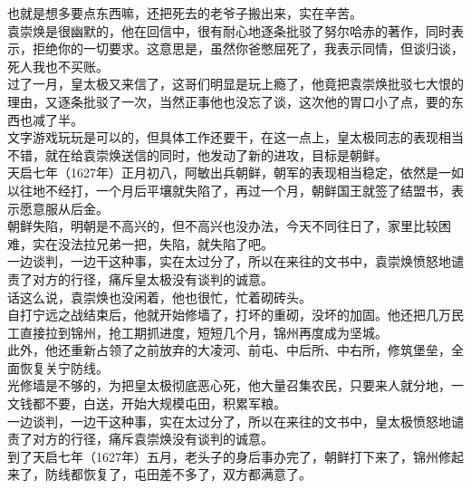 \begin{multicols}{\theparacolNo}
也就是想多要点东西嘛，还把死去的老爷子搬出来，实在辛苦。\\

袁崇焕是很幽默的，他在回信中，很有耐心地逐条批驳了努尔哈赤的著作，同时表示，拒绝你的一切要求。这意思是，虽然你爸憋屈死了，我表示同情，但谈归谈，死人我也不买账。\\

过了一月，皇太极又来信了，这哥们明显是玩上瘾了，他竟把袁崇焕批驳七大恨的理由，又逐条批驳了一次，当然正事他也没忘了谈，这次他的胃口小了点，要的东西也减了半。\\

文字游戏玩玩是可以的，但具体工作还要干，在这一点上，皇太极同志的表现相当不错，就在给袁崇焕送信的同时，他发动了新的进攻，目标是朝鲜。\\

天启七年（1627年）正月初八，阿敏出兵朝鲜，朝军的表现相当稳定，依然是一如以往地不经打，一个月后平壤就失陷了，再过一个月，朝鲜国王就签了结盟书，表示愿意服从后金。\\

朝鲜失陷，明朝是不高兴的，但不高兴也没办法，今天不同往日了，家里比较困难，实在没法拉兄弟一把，失陷，就失陷了吧。\\

一边谈判，一边干这种事，实在太过分了，所以在来往的文书中，袁崇焕愤怒地谴责了对方的行径，痛斥皇太极没有谈判的诚意。\\

话这么说，袁崇焕也没闲着，他也很忙，忙着砌砖头。\\

自打宁远之战结束后，他就开始修墙了，打坏的重砌，没坏的加固。他还把几万民工直接拉到锦州，抢工期抓进度，短短几个月，锦州再度成为坚城。\\

此外，他还重新占领了之前放弃的大凌河、前屯、中后所、中右所，修筑堡垒，全面恢复关宁防线。\\

光修墙是不够的，为把皇太极彻底恶心死，他大量召集农民，只要来人就分地，一文钱都不要，白送，开始大规模屯田，积累军粮。\\

一边谈判，一边干这种事，实在太过分了，所以在来往的文书中，皇太极愤怒地谴责了对方的行径，痛斥袁崇焕没有谈判的诚意。\\

到了天启七年（1627年）五月，老头子的身后事办完了，朝鲜打下来了，锦州修起来了，防线都恢复了，屯田差不多了，双方都满意了。\\


\end{multicols}
